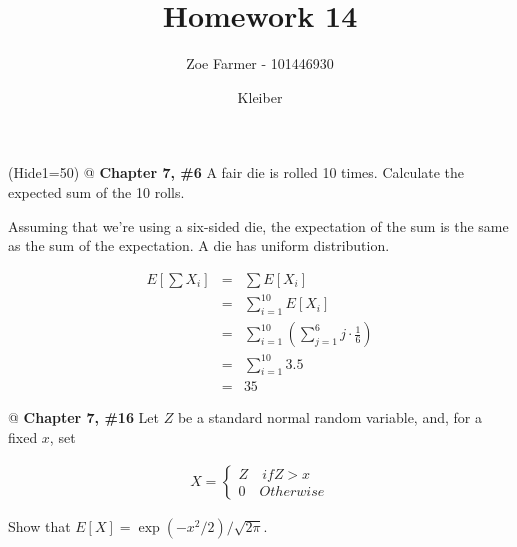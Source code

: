 \documentclass[11pt]{article}\usepackage[]{graphicx}\usepackage[]{xcolor}
\title{Homework 14}
\date{Kleiber}
\author{Zoe Farmer - 101446930}
\begin{document}
\maketitle

\begin{table}[H]
    \centering
\end{table}

\begin{easylist}[enumerate]
    \ListProperties(Hide1=50)
    @ \textbf{Chapter 7, \#6} A fair die is rolled 10 times. Calculate the expected sum of the 10 rolls.\newline

    Assuming that we're using a six-sided die, the expectation of the sum is the same as the sum of the expectation. A
    die has uniform distribution.

    \begin{equation*}
        \begin{aligned}
            E\left[ \sum X_i \right] &=& \sum E\left[ X_i \right]\\
            &=& \sum_{i=1}^{10} E[X_i]\\
            &=& \sum_{i=1}^{10} \left( \sum_{j=1}^6 j \cdot \frac{1}{6} \right)\\
            &=& \sum_{i=1}^{10} 3.5\\
            &=& 35
        \end{aligned}
    \end{equation*}

    @ \textbf{Chapter 7, \#16} Let $Z$ be a standard normal random variable, and, for a fixed $x$, set

    \begin{equation*}
        \begin{aligned}
            X = \begin{cases}
                Z \quad if Z > x\\
                0 \quad Otherwise
            \end{cases}
        \end{aligned}
    \end{equation*}

    Show that $E[X]=\exp\left( -x^2/2 \right)/\sqrt{2 \pi}$.\newline


\end{easylist}
\end{document}
